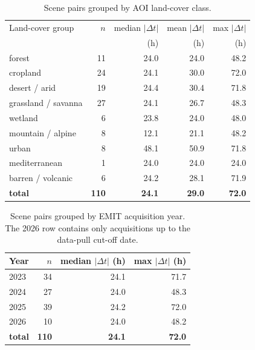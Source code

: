 \begin{table}[h]
  \centering
  \begin{tabular}{lrrrr}
    \toprule
    Land-cover group & $n$ & median $|\Delta t|$ & mean $|\Delta t|$ & max $|\Delta t|$ \\
     &  & (h) & (h) & (h) \\
    \midrule
    forest              & 11  & 24.0 & 24.0 & 48.2 \\
    cropland            & 24  & 24.1 & 30.0 & 72.0 \\
    desert / arid       & 19  & 24.4 & 30.4 & 71.8 \\
    grassland / savanna & 27  & 24.1 & 26.7 & 48.3 \\
    wetland             & 6   & 23.8 & 24.0 & 48.0 \\
    mountain / alpine   & 8   & 12.1 & 21.1 & 48.2 \\
    urban               & 8   & 48.1 & 50.9 & 71.8 \\
    mediterranean       & 1   & 24.0 & 24.0 & 24.0 \\
    barren / volcanic   & 6   & 24.2 & 28.1 & 71.9 \\
    \midrule
    \textbf{total}      & \textbf{110} & \textbf{24.1} & \textbf{29.0} & \textbf{72.0} \\
    \bottomrule
  \end{tabular}
  \caption{Scene pairs grouped by AOI land-cover class.}
  \label{tab:pairs-landcover}
\end{table}

\begin{table}[h]
  \centering
  \begin{tabular}{lrrr}
    \toprule
    Year & $n$ & median $|\Delta t|$ (h) & max $|\Delta t|$ (h) \\
    \midrule
    2023 & 34 & 24.1 & 71.7 \\
    2024 & 27 & 24.0 & 48.3 \\
    2025 & 39 & 24.2 & 72.0 \\
    2026 & 10 & 24.0 & 48.2 \\
    \midrule
    \textbf{total} & \textbf{110} & \textbf{24.1} & \textbf{72.0} \\
    \bottomrule
  \end{tabular}
  \caption{Scene pairs grouped by EMIT acquisition year. The 2026 row
    contains only acquisitions up to the data-pull cut-off date.}
  \label{tab:pairs-year}
\end{table}


